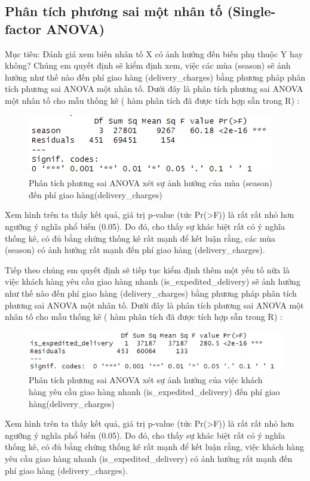 \subsection{Phân tích phương sai một nhân tố (Single-factor ANOVA)}
Mục tiêu: Đánh giá xem biến nhân tố X có ảnh hưởng đến biến phụ thuộc Y hay không?
    Chúng em quyết định sẽ kiểm định xem, việc các mùa (season) sẽ ảnh hưởng như thế nào đến phí giao hàng (delivery\_charges) bằng
phương pháp phân tích phương sai ANOVA một nhân tố. Dưới đây là phân tích phương sai ANOVA một nhân tố cho mẫu thống kê ( hàm phân tích đã được tích hợp sẵn trong R) :

\begin{figure}[!htbp]
    \centering
    \includegraphics[width=0.7\linewidth]{graphics/5.3.1.png}
    \caption{Phân tích phương sai ANOVA xét sự ảnh hưởng của mùa (season) đến phí giao hàng(delivery\_charges)}
\end{figure}

    Xem hình trên ta thấy kết quả, giá trị p-value (tức Pr(>F)) là rất rất nhỏ hơn ngưỡng ý nghĩa phổ biến (0.05). Do đó, cho thấy sự
khác biệt rất có ý nghĩa thống kê, có đủ bằng chứng thống kê rất mạnh để kết luận rằng, các mùa (season) có ảnh hưởng rất mạnh đến phí giao hàng (delivery\_charges).

    Tiếp theo chúng em quyết định sẽ tiếp tục kiểm định thêm một yếu tố nữa là việc khách hàng yêu cầu giao hàng nhanh (is\_expedited\_delivery) sẽ ảnh hưởng như thế nào đến phí giao hàng (delivery\_charges) bằng phương pháp phân tích phương sai ANOVA một nhân tố. Dưới đây là phân tích phương sai ANOVA một nhân tố cho mẫu thống kê ( hàm phân tích đã được tích hợp sẵn trong R) :
\begin{figure}[!htbp]
    \centering
    \includegraphics[width=0.7\linewidth]{graphics/5.3.2.png}
    \caption{Phân tích phương sai ANOVA xét sự ảnh hưởng của việc khách hàng yêu cầu giao hàng nhanh (is\_expedited\_delivery) đến phí giao hàng(delivery\_charges)}
\end{figure}

    Xem hình trên ta thấy kết quả, giá trị p-value (tức Pr(>F)) là rất rất nhỏ hơn ngưỡng ý nghĩa phổ biến (0.05). Do đó, cho thấy sự
khác biệt rất có ý nghĩa thống kê, có đủ bằng chứng thống kê rất mạnh để kết luận rằng, việc khách hàng yêu cầu giao hàng nhanh (is\_expedited\_delivery) có ảnh hưởng rất mạnh đến phí giao hàng (delivery\_charges).
